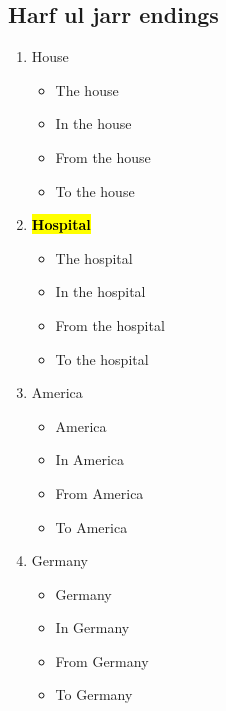 \subsection{Harf ul jarr endings}
\begin{enumerate}
    \item House
    \begin{itemize}
        \item The house \dotfill
        \item In the house \dotfill
        \item From the house \dotfill
        \item To the house \dotfill
    \end{itemize}
    \item \hl{\textbf{Hospital}}
    \begin{itemize}
        \item The hospital \dotfill
        \item In the hospital \dotfill
        \item From the hospital \dotfill
        \item To the hospital \dotfill
    \end{itemize}
    \item America
    \begin{itemize}
        \item America \dotfill
        \item In America \dotfill
        \item From America \dotfill
        \item To America \dotfill
    \end{itemize}
    \item Germany
    \begin{itemize}
        \item Germany \dotfill
        \item In Germany \dotfill
        \item From Germany \dotfill
        \item To Germany \dotfill
    \end{itemize}
    
\end{enumerate}

